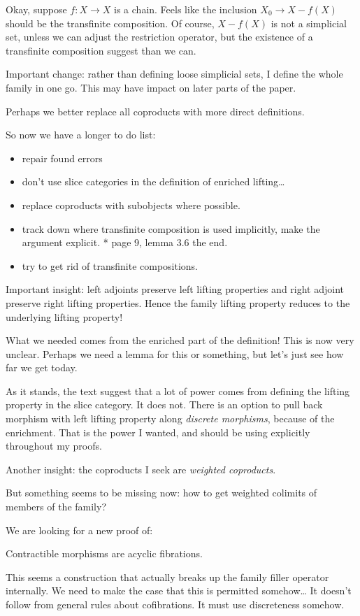 \documentclass{tac}
\newcommand\of{:}
\begin{document}
Okay, suppose $f\of X\to X$ is a chain. Feels like the inclusion $X_0 \to X - f(X)$ should be the transfinite composition. Of course, $X - f(X)$ is not a simplicial set, unless we can adjust the restriction operator, but the existence of a transfinite composition suggest than we can.

Important change: rather than defining loose simplicial sets, I define the whole family in one go.
This may have impact on later parts of the paper.

Perhaps we better replace all coproducts with more direct definitions.

So now we have a longer to do list:
\begin{itemize}
\item repair found errors
\item don't use slice categories in the definition of enriched lifting\dots
\item replace coproducts with subobjects where possible.
\item track down where transfinite composition is used implicitly, make the argument explicit.
  * page 9, lemma 3.6 the end.
	
\item try to get rid of transfinite compositions.
\end{itemize}

Important insight: left adjoints preserve left lifting properties and right adjoint preserve right lifting properties. 
Hence the family lifting property reduces to the underlying lifting property!

What we needed comes from the enriched part of the definition! This is now very unclear.
Perhaps we need a lemma for this or something, but let's just see how far we get today.

As it stands, the text suggest that a lot of power comes from defining the lifting property in the slice category. It does not. 
There is an option to pull back morphism with left lifting property along \emph{discrete morphisms}, because of the enrichment. 
That is the power I wanted, and should be using explicitly throughout my proofs.

Another insight: the coproducts I seek are \emph{weighted coproducts}.

But something seems to be missing now: how to get weighted colimits of members of the family?

We are looking for a new proof of:
\begin{lemma} Contractible morphisms are acyclic fibrations.\end{lemma}
This seems a construction that actually breaks up the family filler operator internally.
We need to make the case that this is permitted somehow\dots
It doesn't follow from general rules about cofibrations. It must use discreteness somehow.
\end{document}

